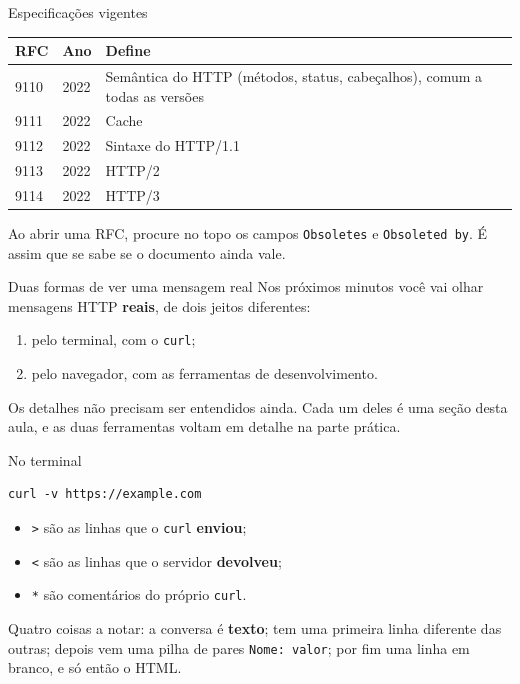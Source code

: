 \documentclass{beamer}
\begin{document}
\begin{frame}{Especificações vigentes}
  \begin{center}
    \small
    \begin{tabular}{@{}llp{4.9cm}@{}}
      \toprule
      \textbf{RFC} & \textbf{Ano} & \textbf{Define} \\
      \midrule
      9110 & 2022 & Semântica do HTTP (métodos, status, cabeçalhos), comum a todas as versões \\
      9111 & 2022 & Cache \\
      9112 & 2022 & Sintaxe do HTTP/1.1 \\
      9113 & 2022 & HTTP/2 \\
      9114 & 2022 & HTTP/3 \\
      \bottomrule
    \end{tabular}
  \end{center}

  \vspace{0.4cm}
  Ao abrir uma RFC, procure no topo os campos \texttt{Obsoletes} e
  \texttt{Obsoleted by}. É assim que se sabe se o documento ainda vale.
\end{frame}

\begin{frame}{Duas formas de ver uma mensagem real}
  Nos próximos minutos você vai olhar mensagens HTTP \textbf{reais}, de dois
  jeitos diferentes:

  \begin{enumerate}
    \item pelo terminal, com o \texttt{curl};
    \item pelo navegador, com as ferramentas de desenvolvimento.
  \end{enumerate}

  \vspace{0.5cm}
  Os detalhes não precisam ser entendidos ainda. Cada um deles é uma seção desta
  aula, e as duas ferramentas voltam em detalhe na parte prática.
\end{frame}

\begin{frame}[fragile]{No terminal}
  \begin{verbatim}
curl -v https://example.com
  \end{verbatim}

  \begin{itemize}
    \item \texttt{>} são as linhas que o \texttt{curl} \textbf{enviou};
    \item \texttt{<} são as linhas que o servidor \textbf{devolveu};
    \item \texttt{*} são comentários do próprio \texttt{curl}.
  \end{itemize}

  \vspace{0.3cm}
  Quatro coisas a notar: a conversa é \textbf{texto}; tem uma primeira linha
  diferente das outras; depois vem uma pilha de pares \texttt{Nome: valor}; por
  fim uma linha em branco, e só então o HTML.
\end{frame}
\end{document}
